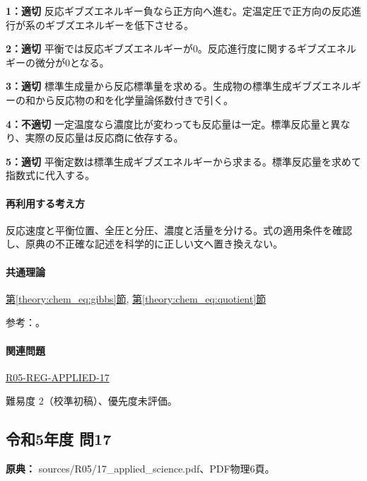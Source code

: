 \noindent\textbf{1：適切} 反応ギブズエネルギー負なら正方向へ進む。定温定圧で正方向の反応進行が系のギブズエネルギーを低下させる。\par

\noindent\textbf{2：適切} 平衡では反応ギブズエネルギーが0。反応進行度に関するギブズエネルギーの微分が0となる。\par

\noindent\textbf{3：適切} 標準生成量から反応標準量を求める。生成物の標準生成ギブズエネルギーの和から反応物の和を化学量論係数付きで引く。\par

\noindent\textbf{4：不適切} 一定温度なら濃度比が変わっても反応量は一定。標準反応量と異なり、実際の反応量は反応商に依存する。\par

\noindent\textbf{5：適切} 平衡定数は標準生成ギブズエネルギーから求まる。標準反応量を求めて指数式に代入する。\par

\paragraph{再利用する考え方} 反応速度と平衡位置、全圧と分圧、濃度と活量を分ける。式の適用条件を確認し、原典の不正確な記述を科学的に正しい文へ置き換えない。

\paragraph{共通理論} \hyperref[theory:chem_eq:gibbs]{第\ref*{theory:chem_eq:gibbs}節}, \hyperref[theory:chem_eq:quotient]{第\ref*{theory:chem_eq:quotient}節}

\par 参考：\cite{iupac_greenbook2012}。

\paragraph{関連問題} \hyperref[q:r05-reg-applied-17]{R05-REG-APPLIED-17}

\par 難易度 2（校準初稿）、優先度未評価。

\subsection{令和5年度 問17}
\label{q:r05-reg-applied-17}

\noindent\textbf{原典：} sources/R05/17\_applied\_science.pdf、PDF物理6頁。

